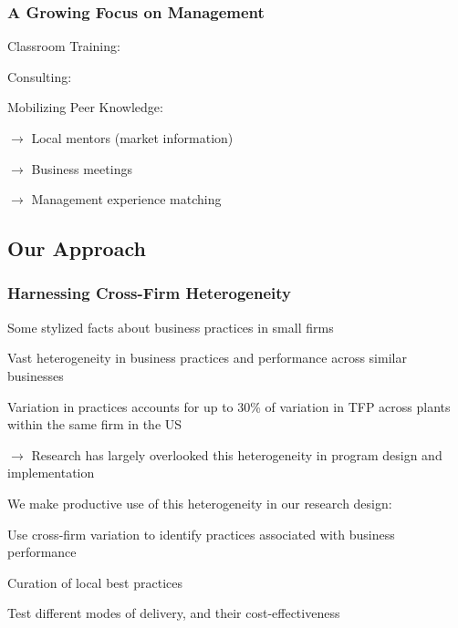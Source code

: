 \documentclass[hideothersubsections, usenames,dvipsnames,11pt]{beamer}
\newenvironment{itemize_2pt}{\itemize\addtolength{\itemsep}{2pt}}{\enditemize}
\begin{document}
\begin{frame}
\frametitle{A Growing Focus on Management}
\begin{itemize_2pt}
\item \textcolor{bdf}{Classroom Training}: \citet{McKenzie2014, Karlan2011, Bruhn2013, Anderson2018, Bulte2017, Field2010}
\vspace{0.1in}
\item \textcolor{bdf}{Consulting}:\citet{Bruhn2018, Anderson2020, Karlan2015}
\vspace{0.1in}

\item \textcolor{bdf}{Mobilizing Peer Knowledge}:
    \begin{itemize_2pt}
    \item \citet{Brooks2018} $\rightarrow$ Local mentors (market information)
    \item \citet{Cai2018} $\rightarrow$ Business meetings
    \item \citet{Abebe2019} $\rightarrow$ Management experience matching
    \end{itemize_2pt}
    \vspace{0.1in}
\end{itemize_2pt}
\end{frame}

\subsection{Our Approach}
\begin{frame}
\frametitle{Harnessing Cross-Firm Heterogeneity}
Some stylized facts about business practices in small firms
\begin{itemize_2pt}
	\item Vast heterogeneity in business practices and performance across similar businesses \citep{McKenzie2017, deMel2009}
	\item Variation in practices accounts for up to 30\% of variation in TFP across plants within the same firm in the US \citep{Bloom2019}
	\item[] $\rightarrow$ Research has largely overlooked this heterogeneity in program design and implementation
\end{itemize_2pt}

\vspace{0.5em}
\pause

We \textcolor{bdf}{make productive use of this heterogeneity} in our research design: 
\begin{itemize_2pt}
	\item Use cross-firm variation to identify \textcolor{bdf}{practices associated with business performance}
	\item \textcolor{bdf}{Curation} of local best practices
	\item Test different \textcolor{bdf}{modes of delivery}, and their cost-effectiveness
\end{itemize_2pt}

\end{frame}
\end{document}
